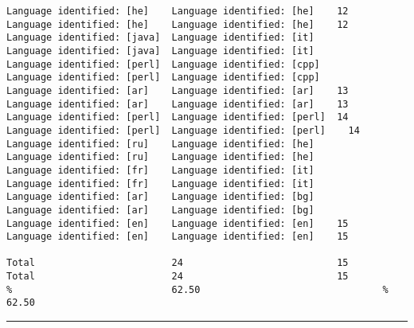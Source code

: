 \begin{verbatim}
Language identified: [he]    Language identified: [he]    12      Language identified: [he]    Language identified: [he]    12
Language identified: [java]  Language identified: [it]            Language identified: [java]  Language identified: [it]
Language identified: [perl]  Language identified: [cpp]           Language identified: [perl]  Language identified: [cpp]
Language identified: [ar]    Language identified: [ar]    13      Language identified: [ar]    Language identified: [ar]    13
Language identified: [perl]  Language identified: [perl]  14      Language identified: [perl]  Language identified: [perl]    14
Language identified: [ru]    Language identified: [he]            Language identified: [ru]    Language identified: [he]
Language identified: [fr]    Language identified: [it]            Language identified: [fr]    Language identified: [it]
Language identified: [ar]    Language identified: [bg]            Language identified: [ar]    Language identified: [bg]
Language identified: [en]    Language identified: [en]    15      Language identified: [en]    Language identified: [en]    15

Total                        24                           15      Total                        24                           15
%                            62.50                                %                            62.50
\end{verbatim}
\vskip4pt\hrule

\clearpage

